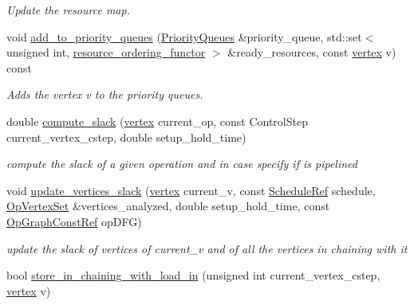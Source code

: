 \begin{DoxyCompactItemize}
\begin{DoxyCompactList}\small\item\em Update the resource map. \end{DoxyCompactList}\item 
void \hyperlink{classparametric__list__based_af39742ae903d232505b44c793bf6c236}{add\+\_\+to\+\_\+priority\+\_\+queues} (\hyperlink{parametric__list__based_8hpp_a13050eea5e8f82ebc18423a4a1b4deb1}{Priority\+Queues} \&priority\+\_\+queue, std\+::set$<$ unsigned int, \hyperlink{structresource__ordering__functor}{resource\+\_\+ordering\+\_\+functor} $>$ \&ready\+\_\+resources, const \hyperlink{graph_8hpp_abefdcf0544e601805af44eca032cca14}{vertex} v) const
\begin{DoxyCompactList}\small\item\em Adds the vertex v to the priority queues. \end{DoxyCompactList}\item 
double \hyperlink{classparametric__list__based_aa040a68024272d93c52aed13f00881bf}{compute\+\_\+slack} (\hyperlink{graph_8hpp_abefdcf0544e601805af44eca032cca14}{vertex} current\+\_\+op, const Control\+Step current\+\_\+vertex\+\_\+cstep, double setup\+\_\+hold\+\_\+time)
\begin{DoxyCompactList}\small\item\em compute the slack of a given operation and in case specify if is pipelined \end{DoxyCompactList}\item 
void \hyperlink{classparametric__list__based_aa979330060c40188e1c74bbae270ac2b}{update\+\_\+vertices\+\_\+slack} (\hyperlink{graph_8hpp_abefdcf0544e601805af44eca032cca14}{vertex} current\+\_\+v, const \hyperlink{schedule_8hpp_af67f402958b3b52a1ec5cc4ce08ae3b9}{Schedule\+Ref} schedule, \hyperlink{classOpVertexSet}{Op\+Vertex\+Set} \&vertices\+\_\+analyzed, double setup\+\_\+hold\+\_\+time, const \hyperlink{op__graph_8hpp_a9a0b240622c47584bee6951a6f5de746}{Op\+Graph\+Const\+Ref} op\+D\+FG)
\begin{DoxyCompactList}\small\item\em update the slack of vertices of current\+\_\+v and of all the vertices in chaining with it \end{DoxyCompactList}\item 
bool \hyperlink{classparametric__list__based_a6043550d51c621f3b47d804c79428a51}{store\+\_\+in\+\_\+chaining\+\_\+with\+\_\+load\+\_\+in} (unsigned int current\+\_\+vertex\+\_\+cstep, \hyperlink{graph_8hpp_abefdcf0544e601805af44eca032cca14}{vertex} v)

\end{DoxyCompactItemize}
